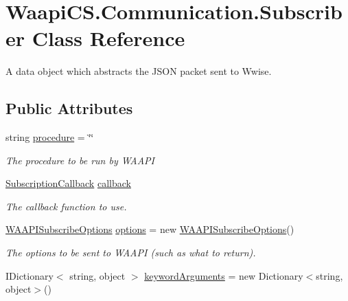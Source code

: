 \hypertarget{class_waapi_c_s_1_1_communication_1_1_subscriber}{}\section{Waapi\+C\+S.\+Communication.\+Subscriber Class Reference}
\label{class_waapi_c_s_1_1_communication_1_1_subscriber}


A data object which abstracts the J\+S\+ON packet sent to Wwise.  


\subsection*{Public Attributes}
\begin{DoxyCompactItemize}
\item 
string \mbox{\hyperlink{class_waapi_c_s_1_1_communication_1_1_subscriber_a2a2eeb3470b7dfed7aaa5784891c59c0}{procedure}} = \char`\"{}\char`\"{}
\begin{DoxyCompactList}\small\item\em The procedure to be run by W\+A\+A\+PI \end{DoxyCompactList}\item 
\mbox{\hyperlink{class_waapi_c_s_1_1_communication_1_1_subscription_callback}{Subscription\+Callback}} \mbox{\hyperlink{class_waapi_c_s_1_1_communication_1_1_subscriber_acc9bb656a9ea5510401dbe5b357e1d25}{callback}}
\begin{DoxyCompactList}\small\item\em The callback function to use. \end{DoxyCompactList}\item 
\mbox{\hyperlink{class_waapi_c_s_1_1_communication_1_1_w_a_a_p_i_subscribe_options}{W\+A\+A\+P\+I\+Subscribe\+Options}} \mbox{\hyperlink{class_waapi_c_s_1_1_communication_1_1_subscriber_ab2e564f4f4d544a14f1df4ddf9dc9f95}{options}} = new \mbox{\hyperlink{class_waapi_c_s_1_1_communication_1_1_w_a_a_p_i_subscribe_options}{W\+A\+A\+P\+I\+Subscribe\+Options}}()
\begin{DoxyCompactList}\small\item\em The options to be sent to W\+A\+A\+PI (such as what to return). \end{DoxyCompactList}\item 
I\+Dictionary$<$ string, object $>$ \mbox{\hyperlink{class_waapi_c_s_1_1_communication_1_1_subscriber_a4036906a690b7b2b408451d42a64040a}{keyword\+Arguments}} = new Dictionary$<$string, object$>$()

\end{DoxyCompactItemize}
